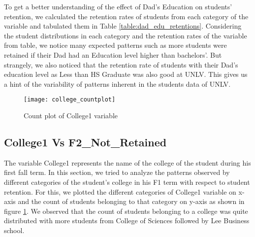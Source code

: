 \documentclass[11pt,openright]{report}
\begin{document}
To get a better understanding of the effect of Dad's Education on students' retention, we calculated the retention rates of students from each category of the variable and tabulated them in Table \ref{table:dad_edu_retentions}. Considering the student distributions in each category and the retention rates of the variable from table, we notice many expected patterns such as more students were retained if their Dad had an Education level higher than bachelors'. But strangely, we also noticed that the retention rate of students with their Dad's education level as Less than HS Graduate was also good at UNLV. This gives us a hint of the variability of patterns inherent in the students data of UNLV.

\begin{figure}
	\centering
	\texttt{[image: college\_countplot]}
	\caption{Count plot of College1 variable}
	\label{fig:college_F2NotRetained_plot}
\end{figure}

\subsection {College1 Vs F2\_Not\_Retained}
The variable College1 represents the name of the college of the student during his first fall term. In this section, we tried to analyze the patterns observed by different categories of the student's college in his F1 term with respect to student retention. For this, we plotted the different categories of College1 variable on x-axis and the count of students belonging to that category on y-axis as shown in figure \ref{fig:college_F2NotRetained_plot}. We observed that the count of students belonging to a college was quite distributed with more students from College of Sciences followed by Lee Business school.
\end{document}
